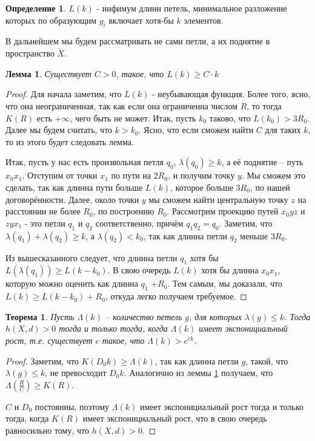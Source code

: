 \documentclass[11pt]{article}
\theoremstyle{definition}
\newtheorem{defin}{Определение}%
\theoremstyle{plain}
\theoremstyle{plain}
\newtheorem{lemma}{Лемма}
\newtheorem{theorem}{Теорема}
\def\leq{\leqslant}
\def\geq{\geqslant}
\def\wt#1{\widetilde{#1}}
\begin{document}
\begin{defin}
	$L(k)$ - инфимум длинн петель, минимальное разложение которых по образующим $g_i$ включает хотя-бы $k$ элементов.
\end{defin}
В дальнейшем мы будем рассматривать не сами петли, а их поднятие в пространство $\wt{X}$.

\begin{lemma}\label{l_C}
Существует $C > 0$, такое, что $L(k) \geq C \cdot k$
\end{lemma}
\begin{proof}
Для начала заметим, что $L(k)$ - неубывающая функция. Более того, ясно, что она неограниченная, так как если она ограниченна числом $R$, 
то тогда $K(R)$ есть $+\infty$, чего быть не может. Итак, пусть $k_0$ таково, что $L(k_0) > 3 R_0$.
Далее мы будем считать, что $k > k_0$. Ясно, что если сможем найти $C$ для таких $k$, то из этого будет следовать лемма.

Итак, пусть у нас есть произвольная петля $q_0$, $\lambda(q_0) \geq k$, а её поднятие -- путь $x_0 x_1$.
Отступим от точки $x_1$ по пути на $2R_0$, и получим точку $y$.
Мы сможем это сделать, так как длинна пути больше $L(k)$, которое больше $3R_0$, по нашей договорённости.
Далее, около точки $y$ мы сможем найти центральную точку $z$ на расстоянии не более $R_0$, по построению $R_0$.
Рассмотрим проекцию путей $x_0yz$ и $zyx_1$ - это петли $q_1$ и $q_2$ соответственно, причём $q_1q_2 = q_0$.
Заметим, что $\lambda(q_1) + \lambda(q_2) \geq k$, а $\lambda(q_2) < k_0$, так как длинна петли $q_2$ меньше $3R_0$. 

Из вышесказанного следует, что длинна петли $q_1$ хотя бы $L(\lambda(q_1)) \geq L(k-k_0)$.
В свою очередь $L(k)$ хотя бы длинна $x_0x_1$, которую можно оценить как длинна $q_1$ $+ R_0$. 
Тем самым, мы доказали, что $L(k) \geq L(k-k_0) + R_0$, откуда легко получаем требуемое.
\end{proof}


\begin{theorem}
Пусть $\Lambda(k)$ -- количество петель $g$, для которых $\lambda(g) \leq k$. 
Тогда $h(X, d) > 0$ тогда и только тогда, когда $\Lambda(k)$ имеет экспонициальный рост, 
т.е. существует $c$ такое, что $\Lambda(k) > e^{ck}$.
\end{theorem}

\begin{proof}
Заметим, что $K(D_0 k) \geq \Lambda(k)$, так как длинна петли $g$, такой, что $\lambda(g) \leq k$, не превосходит $D_0 k$.
Аналогично из леммы \ref{l_C} получаем, что $\Lambda(\frac{R}{C}) \geq K(R)$.

$C$ и $D_0$ постоянны, поэтому $\Lambda(k)$ имеет экспонициальный рост тогда и только тогда, когда $K(R)$ имеет экспонициальный рост,
что в свою очередь равносильно тому, что $h(X, d) > 0$.

\end{proof}
\end{document}
